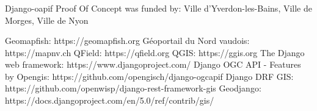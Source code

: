 \documentclass[runningheads]{llncs}
\begin{document}
\begin{credits}
\subsubsection{\ackname} Django-oapif Proof Of Concept was funded by: Ville d'Yverdon-les-Bains, Ville de Morges, Ville de Nyon

\end{credits}
%
%
%
% 
% 
%
\begin{thebibliography}{8}
Geomapfish: https://geomapfish.org
Géoportail du Nord vaudois: https://mapnv.ch
QField: https://qfield.org
QGIS: https://ggis.org 
The Django web  framework: https://www.djangoproject.com/ 
Django OGC API - Features by Opengis: https://github.com/opengisch/django-ogcapif
Django DRF GIS: https://github.com/openwisp/django-rest-framework-gis
Geodjango: https://docs.djangoproject.com/en/5.0/ref/contrib/gis/



\end{thebibliography}
\end{document}
